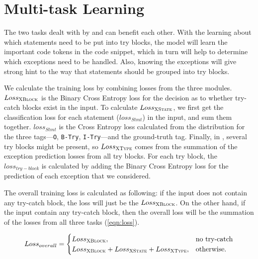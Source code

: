 \section{Multi-task Learning}
\label{sec:multitasking}

The two tasks dealt with by {\xstate} and {\xtype} can benefit each other. With the learning about which statements need to be put into try blocks, the model will learn the important code tokens in the code snippet, which in turn will help to determine which exceptions need to be handled. Also, knowing the exceptions will give strong hint to the way that statements should be grouped into try blocks.

We calculate the training loss by combining losses from the three modules. $Loss_{{\textsc{XBlock}}}$ is the Binary Cross Entropy loss for the decision as to whether try-catch blocks exist in the input. To calculate $Loss_{{\textsc{XState}}}$, we first get the classification loss for each statement ($loss_{Stmt}$) in the input, and sum them together. $loss_{Stmt}$ is the Cross Entropy loss calculated from the distribution for the three tags---\texttt{O}, \texttt{B-Try}, \texttt{I-Try}---and the ground-truth tag. Finally, in \xtype, several try blocks might be present, so $Loss_{{\textsc{XType}}}$ comes from the summation of the exception prediction losses from all try blocks. For each try block, the $loss_{try-block}$ is calculated by adding the Binary Cross Entropy loss for the prediction of each exception that we considered. 

The overall training loss is calculated as following: if the input does not contain any try-catch block, the loss will just be the $Loss_{{\textsc{XBlock}}}$. On the other hand, if the input contain any try-catch block, then the overall loss will be the summation of the losses from all three tasks (\ref{eqn:loss}). 

\begin{equation}
\label{eqn:loss}
Loss_{overall} =
\begin{cases}
Loss_{{\textsc{XBlock}}},  & \text{no try-catch}\\
Loss_{{\textsc{XBlock}}} + Loss_{{\textsc{XState}}} + Loss_{{\textsc{XType}}}, &\text{otherwise.}
\end{cases}
\end{equation}